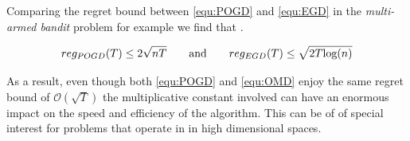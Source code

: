 Comparing the regret bound between \ref{equ:POGD} and \ref{equ:EGD} in the \textit{multi-armed bandit} problem for example we find that \cite{HDRmertikopoulos}. 

\begin{equation*}
    reg_{POGD}(T) \le 2\sqrt{nT} \qquad \textnormal{and} \qquad reg_{EGD}(T) \le \sqrt{2T\textnormal{log}(n)}
\end{equation*}

As a result, even though both \ref{equ:POGD} and \ref{equ:OMD} enjoy the same regret bound of $\mathcal{O}(\sqrt{T})$ the multiplicative constant involved can have an enormous impact on the speed and efficiency of the algorithm. This can be of of special interest for problems that operate in in high dimensional spaces. \\

